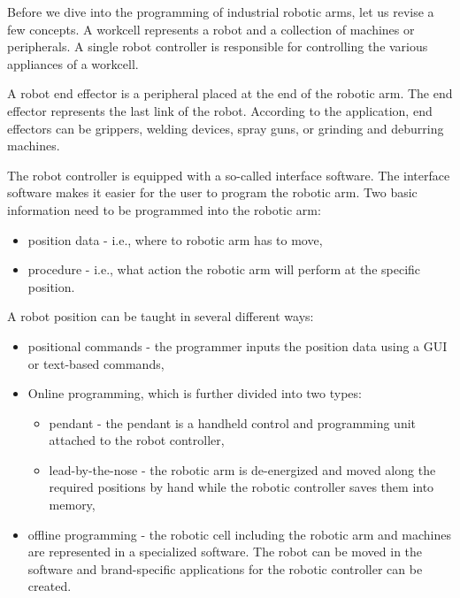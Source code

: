 Before we dive into the programming of industrial robotic arms, let us revise a few concepts.
A workcell represents a robot and a collection of machines or peripherals. A single robot controller is responsible for controlling the various appliances of a workcell.

A robot end effector is a peripheral placed at the end of the robotic arm. The end effector represents the last link of the robot. According to the application, end effectors can be grippers, welding devices, spray guns, or grinding and deburring machines.

The robot controller is equipped with a so-called interface software. The interface software makes it easier for the user to program the robotic arm.  
Two basic information need to be programmed into the robotic arm:

\begin{itemize}
    \item position data - i.e., where to robotic arm has to move,
    \item procedure - i.e., what action the robotic arm will perform at the specific position.
\end{itemize}

A robot position can be taught in several different ways:

\begin{itemize}
    \item positional commands - the programmer inputs the position data using a GUI or text-based commands,
    
    \item Online programming, which is further divided into two types:
    
    \begin{itemize}
    
    \item pendant - the pendant is a handheld control and programming unit attached to the robot controller,
    \item lead-by-the-nose - the robotic arm is de-energized and moved along the required positions by hand while the robotic controller saves them into memory,
    
    \end{itemize}
    
    \item offline programming - the robotic cell including the robotic arm and machines are represented in a specialized software. The robot can be moved in the software and brand-specific applications for the robotic controller can be created.
  

\end{itemize}

